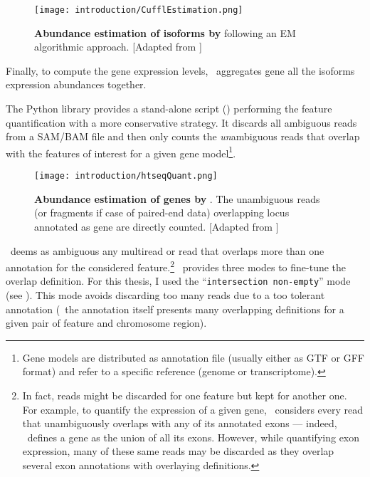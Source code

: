 \begin{figure}
    \texttt{[image: introduction/CufflEstimation.png]}\centering
    \caption[Abundance estimation of isoforms by
    Cufflinks]{\label{fig:cuffEstimation}\textbf{Abundance estimation of isoforms
    by \cuffl} following an \gls{EM} algorithmic approach. [Adapted from
    \cite{Turner2015}]}
\end{figure}

Finally, to compute the gene expression levels, \cuffl\ aggregates 
gene all the isoforms expression abundances together.

The \gls{Python} library  provides a stand-alone script
(\htseq) performing the feature quantification with a more conservative strategy.
It discards all ambiguous reads from a \gls{SAM}/\gls{BAM} file and then
only counts the \emph{un}ambiguous reads that overlap with the features of
interest for a given gene model\footnote{Gene models are distributed as
annotation file (usually either as \gls{GTF} or \gls{GFF} format) and refer
to a specific reference (genome or transcriptome).}.

\begin{figure}
    \texttt{[image: introduction/htseqQuant.png]}\centering
    \caption[Abundance estimation of genes by
    HTSeq-count]{\label{fig:htseqEstimation}\textbf{Abundance estimation of genes
    by \htseq}. The unambiguous reads (or fragments if case of paired-end data)
    overlapping locus annotated as gene are directly counted. [Adapted from
    \cite{MarPhD}]}
  \end{figure}

\htseq\ deems as ambiguous any multiread or read that overlaps more than
one annotation for the considered feature.\footnote{In fact, reads might be
discarded for one feature but kept for another one. For example, to quantify the
expression of a given gene, \htseq\ considers every read that unambiguously
overlaps with any of its annotated exons --- indeed, \htseq\ defines a gene
as the union of all its exons. However, while quantifying exon expression, many
of these same reads may be discarded as they overlap several exon annotations
with overlaying definitions.}
\htseq\ provides
three modes to fine-tune the overlap definition.
For this thesis, I used the ``\texttt{intersection non-empty}'' mode
(see ).
This mode avoids discarding too many reads due to a too tolerant annotation
(\ie\ the annotation itself presents many overlapping definitions for a given
pair of feature and chromosome region).

